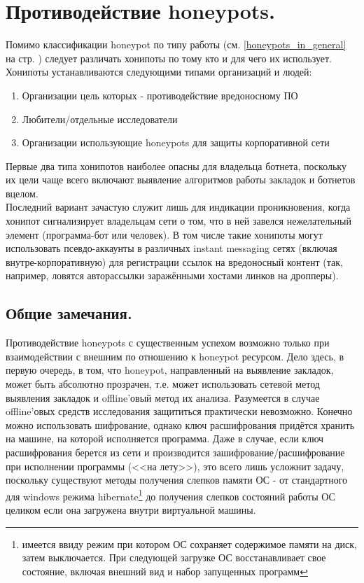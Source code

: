 \section{Противодействие honeypots.}
\label{honeypot_section}
\label{honeypot_section_page}

Помимо классификации honeypot по типу работы (см. \ref{honeypots_in_general} на стр. \pageref{honeypots_in_general} ) следует различать хонипоты по тому кто и для чего их использует.
Хонипоты устанавливаются следующими типами организаций и людей:

\begin{enumerate}
\item{Организации цель которых - противодействие вредоносному ПО}
\item{Любители/отдельные исследователи}
\item{Организации использующие honeypots для защиты корпоративной сети}
\end{enumerate}

Первые два типа хонипотов наиболее опасны для владельца ботнета, поскольку их цели чаще всего включают выявление алгоритмов работы закладок и ботнетов вцелом.\\
Последний вариант зачастую служит лишь для индикации проникновения, когда хонипот сигнализирует
 владельцам сети о том, что в ней завелся нежелательный элемент (программа-бот или человек).
 В том числе такие хонипоты могут использовать псевдо-аккаунты в различных instant messaging
 сетях (включая внутре-корпоративную) для регистрации ссылок на вредоносный контент (так, например,
ловятся авторассылки заражёнными хостами линков на дропперы).


\subsection{Общие замечания.}

Противодействие honeypots с существенным успехом возможно только при
взаимодействии с внешним по отношению к honeypot ресурсом. Дело здесь, в
первую очередь, в том, что honeypot, направленный на выявление закладок,
может быть абсолютно прозрачен, т.е. может использовать сетевой метод
выявления закладок и offline'овый метод их анализа. Разумеется в случае
offline'овых средств исследования защититься практически невозможно.
Конечно можно использовать шифрование, однако ключ расшифрования
придётся хранить на машине, на которой исполняется программа. Даже в
случае, если ключ расшифрования берется из сети и производится
зашифрование/расшифрование  при исполнении программы (<<на лету>>), это
всего лишь усложнит задачу, поскольку существуют методы получения
слепков памяти ОС - от стандартного для windows режима
hibernate\footnote{имеется ввиду  режим при котором ОС сохраняет
содержимое памяти на диск, затем выключается. При следующей загрузке ОС
восстанавливает свое состояние, включая внешний вид и набор запущенных
программ} до получения слепков состояний работы ОС целиком если она
загружена внутри виртуальной машины.

